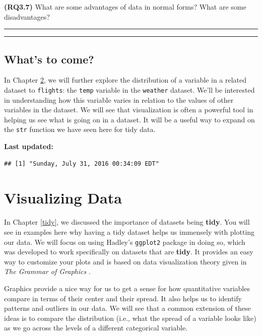 \documentclass[]{tufte-book}
\begin{document}
\textbf{(RQ3.7)} What are some advantages of data in normal forms? What
are some disadvantages?

\begin{center}\rule{0.5\linewidth}{\linethickness}\end{center}

\begin{center}\rule{0.5\linewidth}{\linethickness}\end{center}

\section{What's to come?}\label{whats-to-come}

In Chapter \ref{viz}, we will further explore the distribution of a
variable in a related dataset to \texttt{flights}: the \texttt{temp}
variable in the \texttt{weather} dataset. We'll be interested in
understanding how this variable varies in relation to the values of
other variables in the dataset. We will see that visualization is often
a powerful tool in helping us see what is going on in a dataset. It will
be a useful way to expand on the \texttt{str} function we have seen here
for tidy data.

\textbf{Last updated:}

\begin{verbatim}
## [1] "Sunday, July 31, 2016 00:34:09 EDT"
\end{verbatim}

\chapter{Visualizing Data}\label{viz}

In Chapter \ref{tidy}, we discussed the importance of datasets being
\textbf{tidy}. You will see in examples here why having a tidy dataset
helps us immensely with plotting our data. We will focus on using
Hadley's \texttt{ggplot2} package in doing so, which was developed to
work specifically on datasets that are \textbf{tidy}. It provides an
easy way to customize your plots and is based on data visualization
theory given in \emph{The Grammar of Graphics} \citep{wilkinson2005}.

Graphics provide a nice way for us to get a sense for how quantitative
variables compare in terms of their center and their spread. It also
helps us to identify patterns and outliers in our data. We will see that
a common extension of these ideas is to compare the distribution (i.e.,
what the spread of a variable looks like) as we go across the levels of
a different categorical variable.
\end{document}
